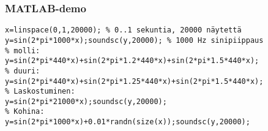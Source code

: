 \begin{frame}[fragile]

\frametitle{MATLAB-demo}
\small
\begin{verbatim}
x=linspace(0,1,20000); % 0..1 sekuntia, 20000 näytettä
y=sin(2*pi*1000*x);soundsc(y,20000); % 1000 Hz sinipiippaus
% molli:
y=sin(2*pi*440*x)+sin(2*pi*1.2*440*x)+sin(2*pi*1.5*440*x); 
% duuri:
y=sin(2*pi*440*x)+sin(2*pi*1.25*440*x)+sin(2*pi*1.5*440*x);
% Laskostuminen:
y=sin(2*pi*21000*x);soundsc(y,20000); 
% Kohina:
y=sin(2*pi*1000*x)+0.01*randn(size(x));soundsc(y,20000);
\end{verbatim}
\end{frame}
